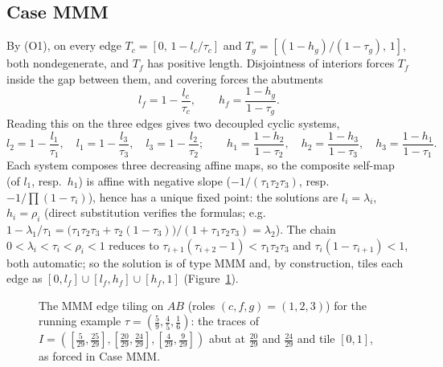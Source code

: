 \documentclass{aims}
\numberwithin{equation}{section}
\theoremstyle{plain}
\theoremstyle{definition}
\theoremstyle{remark}
\begin{document}
\subsection*{Case MMM}
By (O1), on every edge $T_c=[0,\,1-l_c/\tau_c]$ and
$T_g=[(1-h_g)/(1-\tau_g),\,1]$, both nondegenerate, and $T_f$ has positive
length. Disjointness of interiors forces $T_f$ inside the gap between them, and
covering forces the abutments
\[
l_f=1-\frac{l_c}{\tau_c},\qquad h_f=\frac{1-h_g}{1-\tau_g}.
\]
Reading this on the three edges gives two decoupled cyclic systems,
\[
l_2=1-\frac{l_1}{\tau_1},\quad l_1=1-\frac{l_3}{\tau_3},\quad
l_3=1-\frac{l_2}{\tau_2};
\qquad
h_1=\frac{1-h_2}{1-\tau_2},\quad h_2=\frac{1-h_3}{1-\tau_3},\quad
h_3=\frac{1-h_1}{1-\tau_1}.
\]
Each system composes three decreasing affine maps, so the composite self-map
(of $l_1$, resp.\ $h_1$) is affine with negative slope
($-1/(\tau_1\tau_2\tau_3)$, resp.\ $-1/\prod(1-\tau_i)$), hence has a unique
fixed point: the solutions are $l_i=\lambda_i$, $h_i=\rho_i$ (direct
substitution verifies the formulas; e.g.\
$1-\lambda_1/\tau_1
=\bigl(\tau_1\tau_2\tau_3+\tau_2(1-\tau_3)\bigr)/(1+\tau_1\tau_2\tau_3)
=\lambda_2$). The chain
$0<\lambda_i<\tau_i<\rho_i<1$ reduces to
$\tau_{i+1}(\tau_{i+2}-1)<\tau_1\tau_2\tau_3$ and $\tau_i(1-\tau_{i+1})<1$,
both automatic; so the solution is of type MMM and, by construction, tiles each
edge as $[0,l_f]\cup[l_f,h_f]\cup[h_f,1]$ (Figure~\ref{fig:tiling}).

\begin{figure}[ht]
\centering
{}
\caption{The MMM edge tiling on $AB$ (roles $(c,f,g)=(1,2,3)$) for the running
example $\tau=(\tfrac59,\tfrac45,\tfrac16)$: the traces of
$I=([\tfrac5{29},\tfrac{25}{29}],[\tfrac{20}{29},\tfrac{24}{29}],
[\tfrac4{29},\tfrac9{29}])$ abut at $\tfrac{20}{29}$ and $\tfrac{24}{29}$ and
tile $[0,1]$, as forced in Case MMM.}
\label{fig:tiling}
\end{figure}
\end{document}
